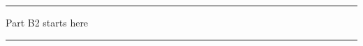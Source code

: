 \documentclass[11pt]{article}
\begin{document}



\clearpage
\hrule
\smallskip
{\centering \small Part B2 starts here

}






\clearpage
\hrule


 

\end{document}
